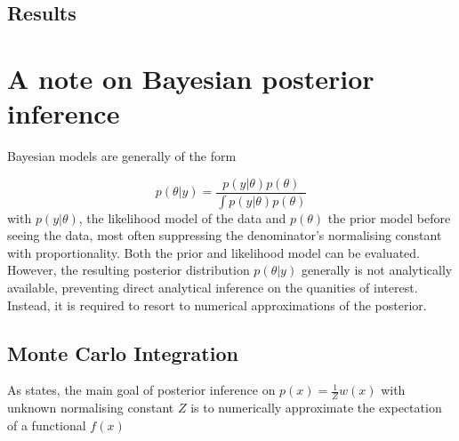 \documentclass[11pt]{article}
\begin{document}
%
        \subsection{Results}


    \section{A note on Bayesian posterior inference} \label{inference}
        Bayesian models are generally of the form

        \begin{equation}
            p(\theta|y) = \frac{p(y|\theta)p(\theta)}{\int p(y|\theta)p(\theta)}
        \end{equation}
        with $p(y|\theta)$, the likelihood model of the data and $p(\theta)$ the prior model before seeing the data, most often suppressing the denominator's normalising constant with proportionality. Both the prior and likelihood model can be evaluated. However, the resulting posterior distribution $p(\theta|y)$ generally is not analytically available, preventing direct analytical inference on the quanities of interest. Instead, it is required to resort to numerical approximations of the posterior.

        \subsection{Monte Carlo Integration}
        As \cite{mackay2003information} states, the main goal of posterior inference on $p(x)= \frac{1}{Z} w(x)$ with unknown normalising constant $Z$ is to numerically approximate the expectation of a functional $f(x)$
\end{document}
